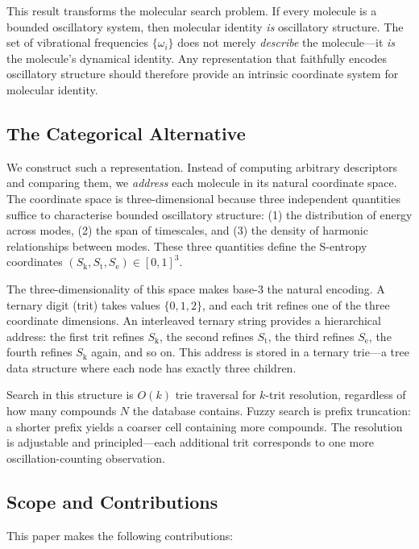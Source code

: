 \documentclass[11pt,a4paper]{article}
\theoremstyle{definition}
\theoremstyle{remark}
\newcommand{\Sk}{S_{\mathrm{k}}}
\newcommand{\St}{S_{\mathrm{t}}}
\newcommand{\Se}{S_{\mathrm{e}}}
\begin{document}
This result transforms the molecular search problem. If every molecule is a bounded oscillatory system, then molecular identity \emph{is} oscillatory structure. The set of vibrational frequencies $\{\omega_i\}$ does not merely \emph{describe} the molecule---it \emph{is} the molecule's dynamical identity. Any representation that faithfully encodes oscillatory structure should therefore provide an intrinsic coordinate system for molecular identity.

\subsection{The Categorical Alternative}

We construct such a representation. Instead of computing arbitrary descriptors and comparing them, we \emph{address} each molecule in its natural coordinate space. The coordinate space is three-dimensional because three independent quantities suffice to characterise bounded oscillatory structure: (1) the distribution of energy across modes, (2) the span of timescales, and (3) the density of harmonic relationships between modes. These three quantities define the S-entropy coordinates $(\Sk, \St, \Se) \in [0,1]^3$.

The three-dimensionality of this space makes base-3 the natural encoding. A ternary digit (trit) takes values $\{0, 1, 2\}$, and each trit refines one of the three coordinate dimensions. An interleaved ternary string provides a hierarchical address: the first trit refines $\Sk$, the second refines $\St$, the third refines $\Se$, the fourth refines $\Sk$ again, and so on. This address is stored in a ternary trie---a tree data structure where each node has exactly three children.

Search in this structure is $O(k)$ trie traversal for $k$-trit resolution, regardless of how many compounds $N$ the database contains. Fuzzy search is prefix truncation: a shorter prefix yields a coarser cell containing more compounds. The resolution is adjustable and principled---each additional trit corresponds to one more oscillation-counting observation.

\subsection{Scope and Contributions}

This paper makes the following contributions:
\end{document}
